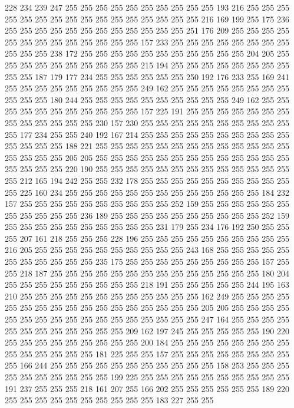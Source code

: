 228 234 239 247 255 255 255 255 255 255 255 255 255 255 193 216 255 255 255 255
255 255 255 255 255 255 255 255 255 255 255 255 216 169 199 255 175 236 255 255
255 255 255 255 255 255 255 255 255 255 251 176 209 255 255 255 255 255 255 255
255 255 255 255 255 255 157 233 255 255 255 255 255 255 255 255 255 255 255 238
172 255 255 255 255 255 255 255 255 255 255 255 204 205 255 255 255 255 255 255
255 255 255 255 215 194 255 255 255 255 255 255 255 255 255 255 187 179 177 234
255 255 255 255 255 255 250 192 176 233 255 169 241 255 255 255 255 255 255 255
255 255 249 162 255 255 255 255 255 255 255 255 255 255 255 180 244 255 255 255
255 255 255 255 255 255 255 249 162 255 255 255 255 255 255 255 255 255 255 255
157 225 191 255 255 255 255 255 255 255 255 255 255 255 255 255 230 157 230 255
255 255 255 255 255 255 255 255 255 255 177 234 255 255 240 192 167 214 255 255
255 255 255 255 255 255 255 255 255 255 255 255 188 221 255 255 255 255 255 255
255 255 255 255 255 255 255 255 255 255 255 205 205 255 255 255 255 255 255 255
255 255 255 255 255 255 255 255 255 255 220 190 255 255 255 255 255 255 255 255
255 255 255 255 255 255 212 165 194 242 255 255 232 178 255 255 255 255 255 255
255 255 255 255 255 225 160 234 255 255 255 255 255 255 255 255 255 255 255 255
255 184 232 157 255 255 255 255 255 255 255 255 255 255 252 159 255 255 255 255
255 255 255 255 255 255 255 236 189 255 255 255 255 255 255 255 255 255 255 252
159 255 255 255 255 255 255 255 255 255 255 231 179 255 234 176 192 250 255 255
255 207 161 218 255 255 255 228 196 255 255 255 255 255 255 255 255 255 255 216
205 255 255 255 255 255 255 255 255 255 255 243 168 255 255 255 255 255 255 255
255 255 255 255 235 175 255 255 255 255 255 255 255 255 255 157 255 255 218 187
255 255 255 255 255 255 255 255 255 255 255 255 255 255 180 204 255 255 255 255
255 255 255 255 255 218 191 255 255 255 255 255 244 195 163 210 255 255 255 255
255 255 255 255 255 255 255 255 162 249 255 255 255 255 255 255 255 255 255 255
255 255 255 255 255 255 255 205 205 255 255 255 255 255 255 255 255 255 255 255
255 255 255 255 255 255 247 164 255 255 255 255 255 255 255 255 255 255 255 255
209 162 197 245 255 255 255 255 255 190 220 255 255 255 255 255 255 255 255 255
200 184 255 255 255 255 255 255 255 255 255 255 255 255 255 255 181 225 255 255
157 255 255 255 255 255 255 255 255 255 166 244 255 255 255 255 255 255 255 255
255 255 255 158 253 255 255 255 255 255 255 255 255 255 255 199 225 255 255 255
255 255 255 255 255 255 255 191 237 255 255 255 218 161 207 255 166 202 255 255
255 255 255 255 189 220 255 255 255 255 255 255 255 255 255 255 183 227 255 255
